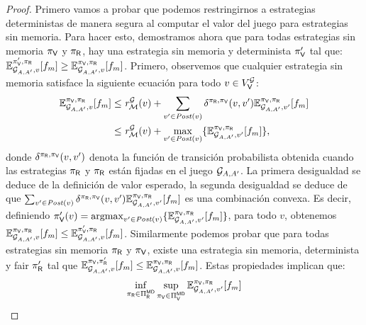 \begin{proof}
Primero vamos a probar que podemos restringirnos a estrategias deterministas de manera segura al computar el valor del juego para estrategias sin memoria.  Para hacer esto, demostramos ahora que para todas estrategias sin memoria $\pi_{\mathsf{V}}$ y $\pi_{\mathsf{R}}$, hay una estrategia sin memoria y determinista
$\pi_{\mathsf{V}}'$ tal que: $\mathbb{E}^{\pi_{\mathsf{V}}',\pi_{\mathsf{R}}}_{\mathcal{G}_{A,A'}, v}[f_{m}]  \geq \mathbb{E}^{\pi_{\mathsf{V}},\pi_{\mathsf{R}}}_{\mathcal{G}_{A,A'}, v}[f_{m}]$. Primero, observemos que cualquier estrategia sin memoria satisface la siguiente ecuación para todo $v \in V^{\mathcal{G}}_{\mathsf{V}}$:
\begin{align}
    \mathbb{E}_{\mathcal{G}_{A,A'},v}^{\pi_{\mathsf{V}},\pi_{\mathsf{R}}}[f_{m}]&  \leq \mathit{r}_{\mathcal{M}}^{\mathcal{G}}(v) + \sum_{v' \in \mathit{Post}(v)} \delta^{\pi_{\mathsf{R}},\pi_{\mathsf{V}}}(v,v')  \mathbb{E}_{\mathcal{G}_{A,A'},v'}^{\pi_{\mathsf{V}},\pi_{\mathsf{R}}}[f_{m}] \label{theo:det-fairness:eq3:l1}\\
    & \leq \mathit{r}_{\mathcal{M}}^{\mathcal{G}}(v)  + \max_{v' \in \mathit{Post}(v)} \{  \mathbb{E}_{\mathcal{G}_{A,A'},v'}^{\pi_{\mathsf{V}},\pi_{\mathsf{R}}}[f_{m}] \},
    \label{theo:det-fairness:eq3:l12}
\end{align}
\sloppy donde $\delta^{\pi_{\mathsf{R}},\pi_{\mathsf{V}}}(v,v')$ denota la función de transición probabilista obtenida cuando las estrategias $\pi_{\mathsf{R}}$ y $\pi_{\mathsf{R}}$
están fijadas en el juego $\mathcal{G}_{A,A'}$. La primera desigualdad se deduce de la definición de valor esperado, la segunda desigualdad se deduce de que $ \sum_{v' \in \mathit{Post}(v)} \delta^{\pi_{\mathsf{R}},\pi_{\mathsf{V}}}(v,v') \mathbb{E}_{\mathcal{G}_{A,A'},v'}^{\pi_{\mathsf{V}},\pi_{\mathsf{R}}}[f_{m}] $ es una combinación convexa. Es decir,  definiendo $\pi_{\mathsf{V}}'(v) = \operatorname*{argmax}_{v' \in \mathit{Post}(v)}  \{ \mathbb{E}_{\mathcal{G}_{A,A'},v'}^{\pi_{\mathsf{V}},\pi_{\mathsf{R}}}[f_{m}] \}$, para todo $v$,  obtenemos
$\mathbb{E}_{\mathcal{G}_{A,A'},v}^{\pi_{\mathsf{V}},\pi_{\mathsf{R}}}[f_{m}] \leq \mathbb{E}_{\mathcal{G}_{A,A'},v}^{\pi_{\mathsf{V}}',\pi_{\mathsf{R}}}[f_{m}]$. 
Similarmente podemos probar que para todas estrategias sin memoria $\pi_{\mathsf{R}}$ y $\pi_{\mathsf{V}}$, existe una estrategia sin memoria, determinista y fair 
$\pi_{\mathsf{R}}'$ tal que  $\mathbb{E}_{\mathcal{G}_{A,A'},v}^{\pi_{\mathsf{V}},\pi_{\mathsf{R}}'}[f_{m}] \leq \mathbb{E}_{\mathcal{G}_{A,A'},v}^{\pi_{\mathsf{V}},\pi_{\mathsf{R}}}[f_{m}]$.  Estas propiedades implican que:
\[
    \inf_{\pi_{\mathsf{R}} \in \Pi_{\mathsf{R}}^{\mathsf{M}\mathsf{D}}}  \sup_{\pi_{\mathsf{V}} \in \Pi_{\mathsf{V}}^{\mathsf{M}\mathsf{D}}} \mathbb{E}_{\mathcal{G}_{A,A'},v'}^{\pi_{\mathsf{V}},\pi_{\mathsf{R}}}[f_{m}] 
\]
\end{proof}
